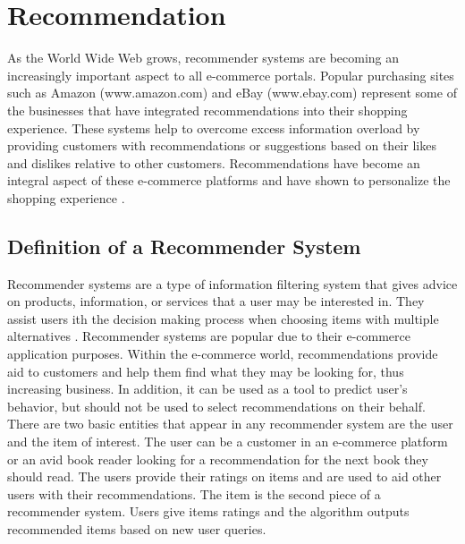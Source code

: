 \section{Recommendation}\label{sec:reco}
As the World Wide Web grows, recommender systems are becoming an increasingly important aspect to all e-commerce portals. Popular purchasing sites such as Amazon (www.amazon.com) and eBay (www.ebay.com) represent some of the businesses that have integrated recommendations into their shopping experience. These systems help to overcome excess information overload by providing customers with recommendations or suggestions based on their likes and dislikes relative to other customers.
Recommendations have become an integral aspect of these e-commerce platforms and have shown to personalize the shopping experience \citep{literature_3}.
\subsection{Definition of a Recommender System}
Recommender systems are a type of information filtering system that gives advice on products, information, or services that a user may be interested in. They assist users ith the decision making process when choosing items with multiple alternatives \citep{literature_4}. Recommender systems are popular due to their e-commerce application purposes. Within the e-commerce world, recommendations provide aid to customers and help them find what they may be looking for, thus increasing business. In addition, it can be used as a tool to predict user's behavior, but should not be used to select recommendations on their behalf.
There are two basic entities that appear in any recommender system are the user and the item of interest. The user can be a customer in an e-commerce platform or an avid book reader looking for a recommendation for the next book they should read. The users provide their ratings on items and are used to aid other users with their recommendations. The item is the second piece of a recommender system. Users give items ratings and the algorithm outputs recommended items based on new user queries.
